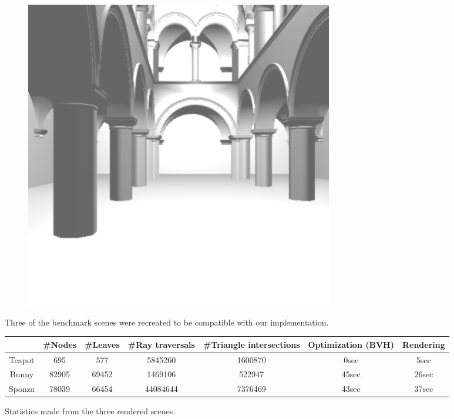 \documentclass[acmsmall]{acmart}
\begin{document}
\begin{figure}[h]
\begin{subfigure}{.3\textwidth}
\end{subfigure} %
\begin{subfigure}{.3\textwidth}
  \centering
  \includegraphics[width=.9\linewidth]{img/benchmarksponza.png}
\end{subfigure}    
    
    \caption{Three of the benchmark scenes were recreated to be compatible with our implementation.}
    \label{fig:benchmark}
\end{figure}


\begin{figure}
\centering
\small{
\begin{tabular}{c|cccccc}
     & \#Nodes    &  \#Leaves   & \#Ray traversals    & \#Triangle intersections    & Optimization (BVH)    & Rendering   \\ \hline
  Teapot  & 695 &  577 &  5845260 &  1600870 &  0sec &  5sec \\
  Bunny  & 82905 &  69452 &  1469106 &  522947 &  45sec &  26sec \\
  Sponza  & 78039 &  66454 &  44084644 &  7376469 &  43sec &  37sec \\
  
\end{tabular}
}
    \caption{Statistics made from the three rendered scenes.}
    \label{fig:benchmarktable}
\end{figure}
\end{document}
